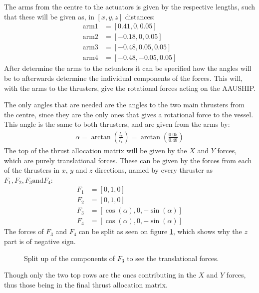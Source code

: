 The arms from the centre to the actuators is given by the respective lengths, such that these will be given as, in $[x, y, z]$ distances:
\begin{align}
\text{arm1} &= [0.41, 0, 0.05]\\
\text{arm2} &= [-0.18, 0, 0.05]\\
\text{arm3} &= [-0.48, 0.05, 0.05]\\
\text{arm4} &= [-0.48, -0.05, 0.05]
\end{align}
After determine the arms to the actuators it can be specified how the angles will be to afterwards determine the individual components of the forces. This will, with the arms to the thrusters, give the rotational forces acting on the AAUSHIP.

The only angles that are needed are the angles to the two main thrusters from the centre, since they are the only ones that gives a rotational force to the vessel. This angle is the same to both thrusters, and are given from the arms by:
\begin{align}
\alpha = \arctan\left(\frac{l_z}{l_x}\right) = \arctan\left(\frac{0.05}{0.48}\right)
\end{align}
The top of the thrust allocation matrix will be given by the $X$ and $Y$ forces, which are purely translational forces. These can be given by the forces from each of the thrusters in $x$, $y$ and $z$ directions, named by every thruster as $F_1, F_2, F_3 \text{and} F_4$:
\begin{align}
F_1 &= [0, 1, 0] \\
F_2 &= [0, 1, 0] \\
F_3 &= [\cos(\alpha), 0, -\sin(\alpha)] \\
F_4 &= [\cos(\alpha), 0, -\sin(\alpha)] 
\end{align}
The forces of $F_3$ and $F_4$ can be split as seen on figure \ref{fig:f3vector}, which shows why the $z$ part is of negative sign.
\begin{figure}[htbp]
	\centering
	
	\caption{Split up of the components of $F_3$ to see the translational forces.}
	\label{fig:f3vector}
\end{figure}
Though only the two top rows are the ones contributing in the $X$ and $Y$ forces, thus those being in the final thrust allocation matrix.


